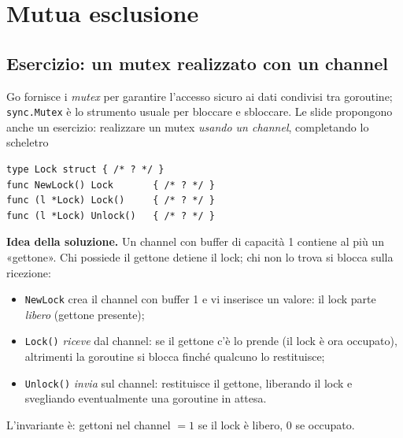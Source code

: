 \documentclass[11pt,a4paper]{report}
\newcommand{\cod}[1]{\texttt{#1}}
\begin{document}
\section{Mutua esclusione}\label{sec:mutex}

\subsection{Esercizio: un mutex realizzato con un channel}

Go fornisce i \emph{mutex} per garantire l'accesso sicuro ai dati condivisi tra
goroutine; \cod{sync.Mutex} è lo strumento usuale per bloccare e sbloccare.
Le slide propongono anche un esercizio: realizzare un mutex \emph{usando un
channel}, completando lo scheletro

\begin{lstlisting}[style=gocode,numbers=none]
type Lock struct { /* ? */ }
func NewLock() Lock       { /* ? */ }
func (l *Lock) Lock()     { /* ? */ }
func (l *Lock) Unlock()   { /* ? */ }
\end{lstlisting}

\textbf{Idea della soluzione.} Un channel con buffer di capacità 1 contiene al
più un «gettone». Chi possiede il gettone detiene il lock; chi non lo trova
si blocca sulla ricezione:

\begin{itemize}
  \item \cod{NewLock} crea il channel con buffer 1 e vi inserisce un valore:
        il lock parte \emph{libero} (gettone presente);
  \item \cod{Lock()} \emph{riceve} dal channel: se il gettone c'è lo prende (il
        lock è ora occupato), altrimenti la goroutine si blocca finché qualcuno
        lo restituisce;
  \item \cod{Unlock()} \emph{invia} sul channel: restituisce il gettone,
        liberando il lock e svegliando eventualmente una goroutine in
        attesa.
\end{itemize}

L'invariante è: gettoni nel channel $=1$ se il lock è libero, $0$ se occupato.
\end{document}
